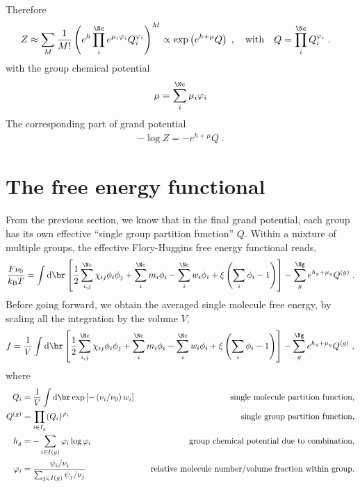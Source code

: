 \documentclass[aps,prl,reprint,onecolumn,groupedaddress,amsmath,amssymb]{revtex4-2}
\newcommand{\dd}{{\mathrm{d}}}
\newcommand{\kBT}{{k_{\mathrm{B}}T}}
\begin{document}
Therefore
\begin{align}
    Z & \approx \sum_{M} \frac{1}{M!} \left( e^{h} \prod_i^{\Nc} e^{\mu_i \varphi_i} Q_i^{\varphi_i} \right)^M \propto \exp \left( e^{h + \mu} Q \right)\;, \quad \mathrm{with} \quad Q = \prod_i^{\Nc} Q_i^{\varphi_i} \;.
\end{align}
with the group chemical potential
\begin{align}
    \mu = \sum_i^{\Nc} \mu_i \varphi_i
\end{align}
The corresponding part of grand potential
\begin{align}
    - \log Z = - e^{h + \mu}  Q \;.
\end{align}

\section{The free energy functional}
From the previous section, we know that in the final grand potential, each group has its own effective ``single group partition function'' $Q$.
Within a mixture of multiple groups, the effective Flory-Huggins free energy functional reads,
\begin{align}
    \frac{F \nu_0}{\kBT} = \int \dd \br \left[\frac{1}{2} \sum_{i,j}^{\Nc} \chi_{ij} \phi_i \phi_j + \sum_i^{\Nc}m_i \phi_i - \sum_i^{\Nc}w_i \phi_i + \xi \left(\sum_i \phi_i -1 \right) \right] - \sum_g^{\Ng} e^{h_g + \mu_g} Q^{(g)} \;.
\end{align}
Before going forward, we obtain the averaged single molecule free energy, by scaling all the integration by the volume $V$,
\begin{align}
    f = \frac{1}{V}\int \dd \br \left[\frac{1}{2} \sum_{i,j}^{\Nc} \chi_{ij} \phi_i \phi_j + \sum_i^{\Nc}m_i \phi_i - \sum_i^{\Nc}w_i \phi_i + \xi \left(\sum_i \phi_i -1 \right) \right] - \sum_g^{\Ng} e^{h_g + \mu_g} Q^{(g)} \;,
\end{align}
where
\begin{subequations}
    \begin{align}
        Q_i       & = \frac{1}{V}\int \dd \br \exp\left[-\left(\nu_i/\nu_0\right) w_i\right]  \quad & \text{single molecule partition function,}                    \\
        Q^{(g)}   & = \prod_{i \in I_g} (Q_i)^{\varphi_i} \quad                                     & \text{single group partition function,}                       \\
        h_g       & = - \sum_{i \in I(g)} \varphi_i \log \varphi_i              \quad               & \text{group chemical potential due to combination,}           \\
        \varphi_i & = \frac{\psi_i / \nu_i}{\sum_{j \in I(g)} \psi_j / \nu_j}\quad                  & \text{relative molecule number/volume fraction within group.}
    \end{align}
\end{subequations}
\end{document}
